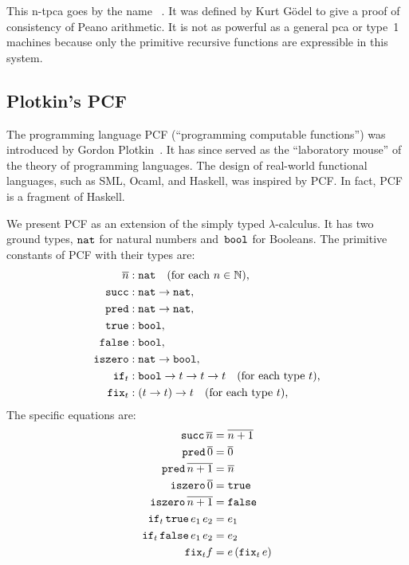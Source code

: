 This n-tpca goes by the name ~. It was defined by Kurt Gödel to give a
proof of consistency of Peano arithmetic. It is not as powerful as a
general pca or type~1 machines because only the primitive recursive
functions are expressible in this system.

\subsection{Plotkin's PCF}
\label{sec:pcf}

The programming language PCF (``programming computable functions'')  was introduced by Gordon Plotkin~. It has since
served as the ``laboratory mouse'' of the theory of programming
languages. The design of real-world functional languages, such as SML,
Ocaml, and Haskell, was inspired by PCF. In fact, PCF is a fragment of
Haskell.

We present PCF as an extension of the simply typed $\lambda$-calculus. It has two ground types, $\mathtt{nat}$ for natural numbers and~$\mathtt{bool}$ for Booleans. The primitive constants of PCF with their types are:
%
\begin{align*}
  \overline{n} &: \mathtt{nat} \quad \text{(for each $n \in \mathbb{N}$),} \\
  \mathtt{succ} &: \mathtt{nat} \to \mathtt{nat}, \\
  \mathtt{pred} &: \mathtt{nat} \to \mathtt{nat}, \\
  \mathtt{true} &: \mathtt{bool}, \\
  \mathtt{false} &: \mathtt{bool}, \\
  \mathtt{iszero} &: \mathtt{nat} \to \mathtt{bool}, \\
  \mathtt{if}_t &: \mathtt{bool} \to t \to t \to t \quad\text{(for each type $t$),}\\
  \mathtt{fix}_t &: (t \to t) \to t \quad\text{(for each type $t$),}
\end{align*}
%
The specific equations are:
%
\begin{align*}
  \mathtt{succ} \, \overline{n} &= \overline{n + 1}
  \\
  \mathtt{pred} \, \overline{0} &= \overline{0}
  \\
  \mathtt{pred} \, \overline{n+1} &= \overline{n}
  \\
  \mathtt{iszero} \, \overline{0} &= \mathtt{true}
  \\
  \mathtt{iszero} \, \overline{n+1} &= \mathtt{false}
  \\
  \mathtt{if}_t \, \mathtt{true} \, e_1 \, e_2 &= e_1
  \\
  \mathtt{if}_t \, \mathtt{false} \, e_1 \, e_2 &= e_2
  \\
  \mathtt{fix}_t f &= e \, (\mathtt{fix}_t \, e)
\end{align*}
%

